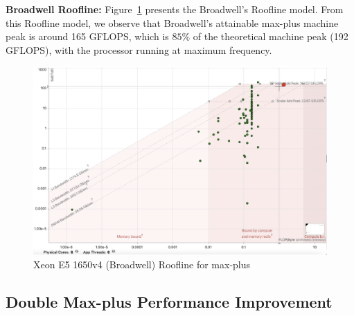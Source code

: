 {\textbf{Broadwell Roofline:}} Figure~\ref{fig:roof_line_broad_well} presents the Broadwell's Roofline model. From this Roofline model, we observe that Broadwell's attainable max-plus machine peak is around 165 GFLOPS, which is $85\%$ of the theoretical machine peak (192 GFLOPS), with the processor running at maximum frequency.

\begin{figure}[htbp]
\centerline{\includegraphics[scale=0.20, trim=0 0 0 0,clip]{content/figures/roofline_broadwell.png}}
\caption{Xeon E5 1650v4 (Broadwell) Roofline for max-plus}
\label{fig:roof_line_broad_well}
\end{figure}





\subsection{Double Max-plus Performance Improvement}
